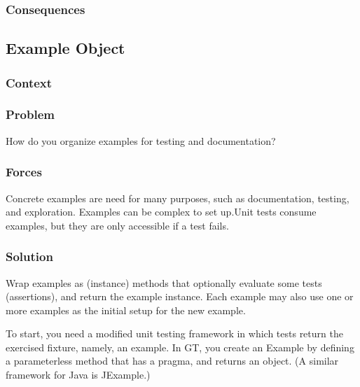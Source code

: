 \documentclass[sigconf]{acmart}
\begin{document}

\subsubsection*{Consequences}

\subsection*{Example Object}\label{pat:exampleObject}


\subsubsection*{Context}
\subsubsection*{Problem}

How do you organize examples for testing and documentation?

\subsubsection*{Forces}

Concrete examples are need for many purposes, such as documentation, testing, and exploration.
Examples can be complex to set up.Unit tests consume examples, but they are only accessible if a test fails.

\subsubsection*{Solution}

Wrap examples as (instance) methods that optionally evaluate some tests (assertions), and return the example instance. Each example may also use one or more examples as the initial setup for the new example.

To start, you need a modified unit testing framework in which tests return the exercised fixture, namely, an example. In GT, you create an Example by defining a parameterless method that has a  pragma, and returns an object. (A similar framework for Java is JExample.)
\end{document}
